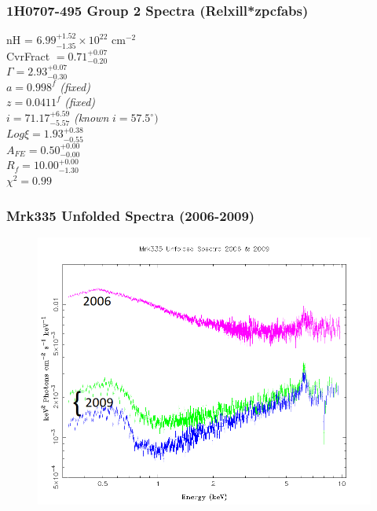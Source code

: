 \documentclass[]{beamer}
\begin{document}
\begin{frame}
\frametitle{1H0707-495 Group 2 Spectra (Relxill*zpcfabs)}
\centering
nH = $6.99^{+1.52}_{-1.35} \times 10^{22}$ cm$^{-2}$\\ \vspace{0.2cm}
CvrFract $ = 0.71^{+0.07}_{-0.20}$\\ \vspace{0.2cm}
$\Gamma = 2.93^{+0.07}_{-0.30}$\\ \vspace{0.2cm}
$a = 0.998^{f}$ \textit{(fixed)}\\ \vspace{0.2cm}
$z = 0.0411^{f}$ \textit{(fixed)}\\ \vspace{0.2cm}
$i = 71.17^{+6.59}_{-5.57}$ \textit{(known} $i = 57.5^\circ)$\\\vspace{0.2cm}
$Log\xi = 1.93^{+0.38}_{-0.55}$\\ \vspace{0.2cm}
$A_{FE}  = 0.50^{+0.00}_{-0.00}$\\ \vspace{0.2cm}
$R_f = 10.00^{+0.00}_{-1.30}$\\ \vspace{0.2cm}
$\chi^2 = 0.99$\\
\end{frame}

\begin{frame}
\frametitle{Mrk335 Unfolded Spectra (2006-2009)}
\begin{figure}\centering
\includegraphics[scale=.40]{Mrk335_specall.png}
\end{figure}
\end{frame}
\end{document}
